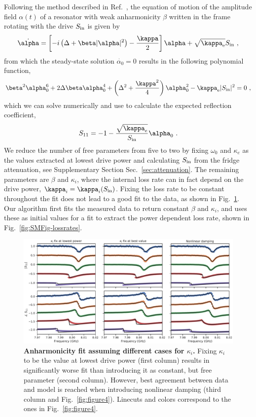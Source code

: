 Following the method described in Ref.~\cite{schmidtCurrentDetectionUsing2020}, the equation of motion of the amplitude field $\alpha(t)$ of a resonator with weak anharmonicity $\beta$ written in the frame rotating with the drive $S_{\rm in}$ is given by
%
\begin{align}
\dot{\alpha} = \left[ -i \left( \Delta+\beta\abs{\alpha}^2 \right)-\frac{\kappa}{2} \right]\alpha + \sqrt{\kappa_\text{e}} S_\text{in}\ ,
\label{eq:Duffing-EOM}
\end{align}
%
from which the steady-state solution $\dot{\alpha_0}=0$ results in the following polynomial function,
% 
\begin{align}
\beta^2 \alpha_0^6 + 2\Delta\beta\alpha_0^4 + \left(\Delta^2+\frac{\kappa^2}{4}\right)\alpha_0^2 - \kappa_\text{e} \abs{S_{\rm in}}^2 = 0\ ,
\label{eq:polynom}
\end{align}
%
which we can solve numerically and use to calculate the expected reflection coefficient,
\begin{align}
S_{11}=-1-\frac{\sqrt{\kappa_e}}{S_{\rm in}}\alpha_0\ .
\label{eq:S11anh}
\end{align}
%
We reduce the number of free parameters from five to two by fixing $\omega_0$ and $\kappa_e$ as the values extracted at lowest drive power and calculating $S_{\rm in}$ from the fridge attenuation, see Supplementary Section Sec.~\ref{sec:attenuation}.
%
The remaining parameters are $\beta$ and $\kappa_i$, where the internal loss rate can in fact depend on the drive power, $\kappa_i=\kappa_i(S_{\rm in})$.
%
Fixing the loss rate to be constant throughout the fit does not lead to a good fit to the data, as shown in Fig.~\ref{fig:SMpower}.
%
Our algorithm first fits the measured data to return constant $\beta$ and $\kappa_i$, and uses these as initial values for a fit to extract the power dependent loss rate, shown in Fig.~\ref{fig:SMFig-lossrates}.

\begin{figure}
	\centering
	\includegraphics[width=\linewidth]{chapter-gJJ-CPR/figs/SMFigure-power}
	\caption{
		\textbf{Anharmonicity fit assuming different cases for $\kappa_i$.}
		Fixing $\kappa_i$ to be the value at lowest drive power (first column) results in significantly worse fit than introducing it as constant, but free parameter (second column).
		However, best agreement between data and model is reached when introducing nonlinear damping (third column and Fig.~\ref{fig:figure4}).
		Linecuts and colors correspond to the ones in Fig.~\ref{fig:figure4}.
	}
	\label{fig:SMpower}
\end{figure}

